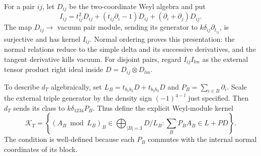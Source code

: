 For a pair $ij$, let $D_{ij}$ be the two-coordinate Weyl algebra and put
\begin{equation}\label{eq:bdfour-binary-ideal}
 I_{ij}=t_{ij}^2D_{ij}+(t_{ij}\partial_i-1)D_{ij}
                                  +(\partial_i+\partial_j)D_{ij}.
\end{equation}
The map $D_{ij}\to$ vacuum pair module, sending its generator to $k\delta_{ij}\partial_{t_{ij}}$, is surjective and has kernel $I_{ij}$.
Normal ordering proves this presentation: the normal relations reduce to the simple delta and its successive derivatives, and the tangent derivative kills vacuum.
For disjoint pairs, regard $I_{ij}I_{lm}$ as the external tensor product right ideal inside $D=D_{ij}\otimes D_{lm}$.

To describe $d_T$ algebraically, set $L_B=t_{b_1b_3}D+t_{b_2b_3}D$ and $P_B=\sum_{i\in B}\partial_i$.
Scale the external triple generator by the density sign $(-1)^{4-l}$ just specified.
Then $d_T$ sends its class to $k\delta_{1234}P_B$.
Thus define the explicit Weyl-module kernel
\begin{equation}\label{eq:bdfour-triple-kernel}
 \mathcal K_T=
 \left\{(A_B\bmod L_B)_B\in\bigoplus_{|B|=3}D/L_B:
             \sum_B P_BA_B\in L+PD\right\}.
\end{equation}
The condition is well-defined because each $P_B$ commutes with the internal normal coordinates of its block.


